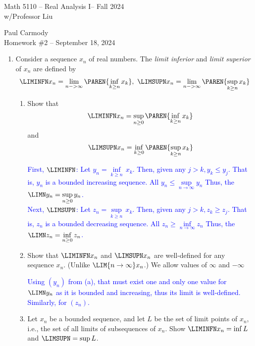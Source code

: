 \documentclass[10pt,a4paper]{report}
\newcommand{\CLASSNAME}{Math 5110 -- Real Analysis I}
\newcommand{\STUDENTNAME}{Paul Carmody}
\newcommand{\ASSIGNMENT}{Homework \#2 }
\newcommand{\DUEDATE}{September 18, 2024}
\newcommand{\SEMESTER}{Fall 2024}
\newcommand{\BLUE}[1]{\textcolor{blue}{#1}}
\begin{document}
\begin{center}
	\Large{\CLASSNAME -- \SEMESTER} \\
	\large{ w/Professor Liu}
\end{center}
\begin{center}
	\STUDENTNAME \\
	\ASSIGNMENT -- \DUEDATE\\
\end{center} 

\begin{enumerate}[label=\Roman*.]
\item Consider a sequence $x_n$ of real numbers.  The \textit{limit inferior} and \textit{limit superior} of $x_n$ are defined by 
\begin{align*}
	\LIMINFN x_n = \lim_{n->\infty}\PAREN{\inf_{k \ge n} x_k }, \,\, \LIMSUPN x_n = \lim_{n->\infty}\PAREN{\sup_{k \ge n} x_k }
\end{align*}
	\begin{enumerate}[label=(\alph*)]
		\item Show that
			\begin{align*}
				\LIMINFN x_n = \sup_{n\ge 0} \PAREN{\inf_{k\ge n} x_k}
			\end{align*}and
			\begin{align*}
				\LIMSUPN x_n = \inf_{k\ge 0}\PAREN{\sup_{k\ge n} x_k}
			\end{align*}
		
		\BLUE{First, $\LIMINFN$: Let $y_n = \underset{k\ge n}\inf\, x_k$. Then, given any $j>k, y_k \le y_j$.  That is, $y_n$ is a bounded increasing sequence.  All $y_n \le \underset{n \to \infty}\sup y_n$  Thus, the $\LIMN y_n = \underset{n\ge 0}\sup\, y_n$.\\
		Next, $\LIMSUPN$:  Let $z_n = \underset{k\ge n}\sup\, x_k$. Then, given any $j>k, z_k \ge z_j$.  That is, $z_n$ is a bounded decreasing sequence.  All $z_n \ge \underset{n \to \infty}\inf z_n$  Thus, the $\LIMN z_n = \underset{n\ge 0}\inf\, z_n$.\\
		}
		
		\item Show that $\LIMINFN x_n$ and $\LIMSUPN x_n$ are well-defined for any sequence $x_n$.  (Unlike $\LIM{n\to\infty} x_n$.)  We allow values of $\infty$ and $-\infty$

		\BLUE{Using $(y_n)$ from (a), that must exist one and only one value for $\LIMN y_n$ as it is bounded and increasing, thus its limit is well-defined.  Similarly, for $(z_n)$.
		}
				
		\item Let $x_n$ be a bounded sequence, and let $L$ be the set of limit points of $x_n$, i.e., the set of all limits of subsequences of $x_n$.  Show $\LIMINFN x_n = \inf L$ and $\LIMSUPN = \sup L$.
		

\end{enumerate}
\end{enumerate}
\end{document}
